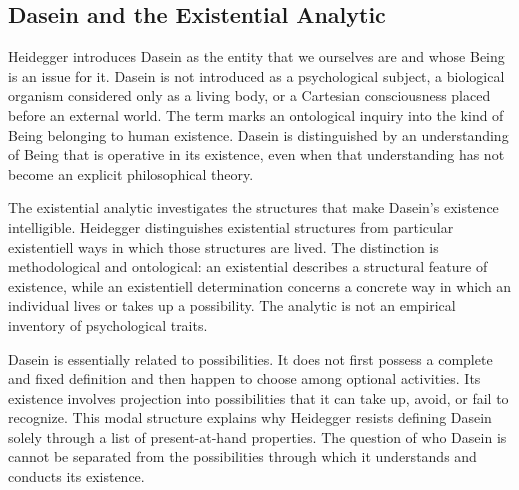 
\subsection{Dasein and the Existential Analytic}
\label{subsec:ch08-heidegger-dasein}

\label{para:VS.B01.P01.C08.S11.SS04.P001}

Heidegger introduces Dasein as the entity that we ourselves
are and whose Being is an issue for it. Dasein is not
introduced as a psychological subject, a biological
organism considered only as a living body, or a Cartesian
consciousness placed before an external world. The term
marks an ontological inquiry into the kind of Being
belonging to human existence. Dasein is distinguished
by an understanding of Being that is operative in its
existence, even when that understanding has not become
an explicit philosophical theory.
\cite[§§4, 9--10]{HeideggerBeingTime}

\label{para:VS.B01.P01.C08.S11.SS04.P002}

The existential analytic investigates the structures
that make Dasein's existence intelligible. Heidegger
distinguishes existential structures from particular
existentiell ways in which those structures are lived.
The distinction is methodological and ontological:
an existential describes a structural feature of
existence, while an existentiell determination concerns
a concrete way in which an individual lives or takes
up a possibility. The analytic is not an empirical
inventory of psychological traits.

\label{para:VS.B01.P01.C08.S11.SS04.P003}

Dasein is essentially related to possibilities. It
does not first possess a complete and fixed definition
and then happen to choose among optional activities.
Its existence involves projection into possibilities
that it can take up, avoid, or fail to recognize.
This modal structure explains why Heidegger resists
defining Dasein solely through a list of present-at-hand
properties. The question of who Dasein is cannot be
separated from the possibilities through which it
understands and conducts its existence.
\cite[§§9, 31, 41]{HeideggerBeingTime}

